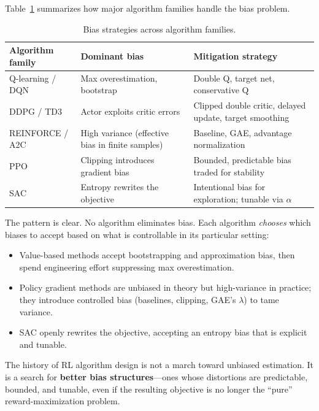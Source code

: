 Table~\ref{tab:bias-strategies} summarizes how major algorithm families handle
the bias problem.

\begin{table}[ht]
\centering
\caption{Bias strategies across algorithm families.}
\label{tab:bias-strategies}
\begin{tabular}{@{}lp{4cm}p{4.5cm}@{}}
\toprule
\textbf{Algorithm family} & \textbf{Dominant bias} & \textbf{Mitigation strategy} \\
\midrule
Q-learning / DQN &
  Max overestimation, bootstrap &
  Double Q, target net, conservative Q \\
DDPG / TD3 &
  Actor exploits critic errors &
  Clipped double critic, delayed update, target smoothing \\
REINFORCE / A2C &
  High variance (effective bias in finite samples) &
  Baseline, GAE, advantage normalization \\
PPO &
  Clipping introduces gradient bias &
  Bounded, predictable bias traded for stability \\
SAC &
  Entropy rewrites the objective &
  Intentional bias for exploration; tunable via $\alpha$ \\
\bottomrule
\end{tabular}
\end{table}

The pattern is clear.  No algorithm eliminates bias.  Each algorithm
\emph{chooses} which biases to accept based on what is controllable in its
particular setting:

\begin{itemize}[nosep]
  \item Value-based methods accept bootstrapping and approximation bias, then
    spend engineering effort suppressing max overestimation.
  \item Policy gradient methods are unbiased in theory but high-variance in
    practice; they introduce controlled bias (baselines, clipping, GAE's
    $\lambda$) to tame variance.
  \item SAC openly rewrites the objective, accepting an entropy bias that is
    explicit and tunable.
\end{itemize}

\begin{keyidea}
The history of RL algorithm design is not a march toward unbiased estimation.
It is a search for \textbf{better bias structures}---ones whose distortions are
predictable, bounded, and tunable, even if the resulting objective is no longer
the ``pure'' reward-maximization problem.
\end{keyidea}


